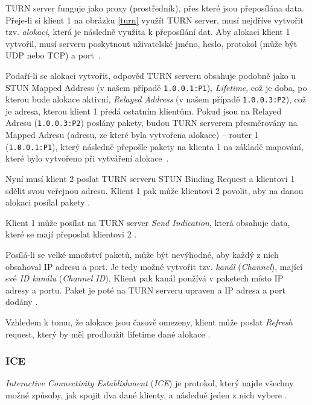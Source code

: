 TURN server funguje jako proxy (prostředník), přes které jsou přeposílána data.
Přeje-li si klient 1 na obrázku \ref{turn} využít TURN server, musí nejdříve
vytvořit tzv. \textit{alokaci}, která je následně využita k přeposílání dat. Aby
alokaci klient 1 vytvořil, musí serveru poskytnout uživatelské jméno, heslo,
protokol (může být UDP nebo TCP) a port~\cite{WebRTCForTheCurious}.

Podaří-li se alokaci vytvořit, odpověď TURN serveru obsahuje podobně jako u STUN
Mapped Address (v našem případě \texttt{1.0.0.1:P1}),
\textit{Lifetime}, což je doba, po kterou bude alokace aktivní, \textit{Relayed
Address} (v našem případě \texttt{1.0.0.3:P2}), což je adresa, kterou
klient 1 předá ostatním klientům. Pokud jsou na Relayed Adresu
(\texttt{1.0.0.3:P2}) poslány pakety, budou TURN serverem přesměrovány
na Mapped Adresu (adresu, ze které byla vytvořena alokace) -- router 1
(\texttt{1.0.0.1:P1}), který následně přepošle pakety na klienta 1 na
základě mapování, které bylo vytvořeno při vytváření
alokace~\cite{WebRTCForTheCurious}.

Nyní musí klient 2 poslat TURN serveru STUN Binding Request a klientovi 1 sdělit
svou veřejnou adresu. Klient 1 pak může klientovi 2 povolit, aby na danou alokaci
posílal pakety \cite{WebRTCForTheCurious}.

Klient 1 může posílat na TURN server \textit{Send Indication}, která obsahuje
data, které se mají přeposlat klientovi 2 \cite{WebRTCForTheCurious}.

Posílá-li se velké množství paketů, může být nevýhodné, aby každý z nich
obsahoval IP adresu a port. Je tedy možné vytvořit tzv. \textit{kanál}
(\textit{Channel}), mající své \textit{ID kanálu} (\textit{Channel ID}). Klient
pak kanál používá v paketech místo IP adresy a portu. Paket je poté na TURN
serveru upraven a IP adresa a port dodány \cite{WebRTCForTheCurious}.

Vzhledem k tomu, že alokace jsou časově omezeny, klient může poslat
\textit{Refresh} request, který by měl prodloužit lifetime dané alokace
\cite{WebRTCForTheCurious}.

\subsubsection{ICE}\label{ice}

\textit{Interactive Connectivity Establishment} (\textit{ICE}) je protokol,
který najde všechny možné způsoby, jak spojit dva dané klienty, a následně jeden
z nich vybere \cite{WebRTCForTheCurious}.

